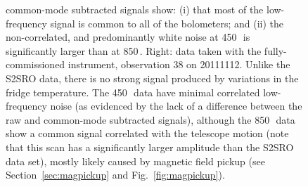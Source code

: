 \documentclass[useAMS,usenatbib,nofootinbib]{mn2e}
\begin{document}
\begin{figure}
{  common-mode subtracted signals show: (i) that most of the
  low-frequency signal is common to all of the bolometers; and (ii)
  the non-correlated, and predominantly white noise at 450\,\micron\
  is significantly larger than at 850\,\micron. Right: data taken with
  the fully-commissioned instrument, observation 38 on
  20111112. Unlike the S2SRO data, there is no strong signal produced
  by variations in the fridge temperature. The 450\,\micron\ data have
  minimal correlated low-frequency noise (as evidenced by the lack of
  a difference between the raw and common-mode subtracted signals),
  although the 850\,\micron\ data show a common signal correlated with
  the telescope motion (note that this scan has a significantly larger
  amplitude than the S2SRO data set), mostly likely caused by magnetic
  field pickup (see Section~\ref{sec:magpickup} and
  Fig.~\ref{fig:magpickup}).}
\label{fig:bolos_mix}
\end{figure}
\end{document}
